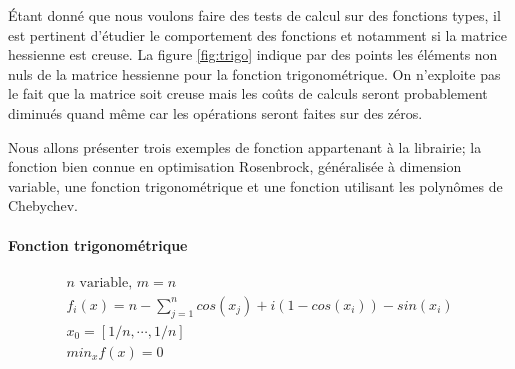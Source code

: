 % 
% 
% 
\'Etant donn\'e que nous voulons faire des tests de calcul sur des fonctions types, il est pertinent
d'\'etudier le comportement des fonctions et notamment si la matrice hessienne est creuse.
La figure \ref{fig:trigo} indique par des points les \'el\'ements non nuls de la matrice hessienne
pour la fonction trigonom\'etrique.
On n'exploite pas le fait que la matrice soit creuse mais les coûts de calculs seront probablement
diminu\'es quand même car les op\'erations seront faites sur des z\'eros.



% 
Nous allons pr\'esenter trois exemples de fonction appartenant \`a la librairie; la fonction bien connue en optimisation Rosenbrock, g\'en\'eralis\'ee \`a dimension variable, 
une fonction trigonom\'etrique et une fonction utilisant les polynômes de Chebychev.
% 
% 
% 



\paragraph{Fonction trigonom\'etrique}
\begin{align*}
n \text{ variable, } m=n \\
f_i(x)=n-\sum_{j=1}^{n}cos(x_j)+i(1-cos(x_i))-sin(x_i) \\
x_0= [1/n, \cdots , 1/n] \\
min_x f(x) = 0
\end{align*}



